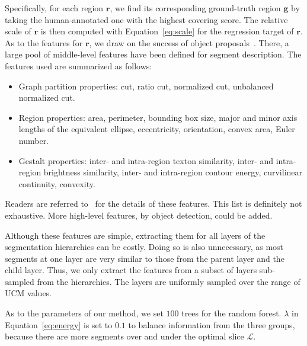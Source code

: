 Specifically, for each region $\mathbf{r}$, we find its corresponding
ground-truth region $\mathbf{g}$ by taking the human-annotated one with the
highest covering score. 
The relative scale of $\mathbf{r}$ is then computed with
Equation~\ref{eq:scale} for the regression target of $\mathbf{r}$.
As to the features for $\mathbf{r}$, we draw on the
success of object proposals~\cite{carreira2010constrained,arbelaez2014multiscale}.
There, a large pool of middle-level features have been defined for segment description.
The features used are summarized as follows:
\begin{itemize}
\item Graph partition properties: cut, ratio cut, normalized cut, unbalanced normalized cut. 
\item Region properties:  area, perimeter, bounding box size, major and minor axis lengths of the equivalent ellipse, eccentricity, orientation, convex area, Euler number.
\item Gestalt properties: inter- and intra-region texton similarity, inter- and intra-region brightness similarity, inter- and intra-region contour energy, curvilinear continuity, convexity.
\end{itemize}
Readers are referred to~\cite{carreira2010constrained} for the details
of these features. This list is definitely not exhaustive.
More high-level features, \eg by object detection, could be added.

Although these features are simple, extracting them for all layers of
the segmentation hierarchies can be costly.
Doing so is also unnecessary, as most segments at one layer are very
similar to those from the parent layer and the child layer.
Thus, we only extract the features from a subset of layers
sub-sampled from the hierarchies.
The layers are uniformly sampled over the range of UCM values. 

As to the parameters of our method, we set $100$ trees for the random
forest. $\lambda$ in Equation~\ref{eq:energy} is set to $0.1$ to
balance information from the three groups, because there are more
segments over and under the optimal slice $\mathcal{L}$. %


